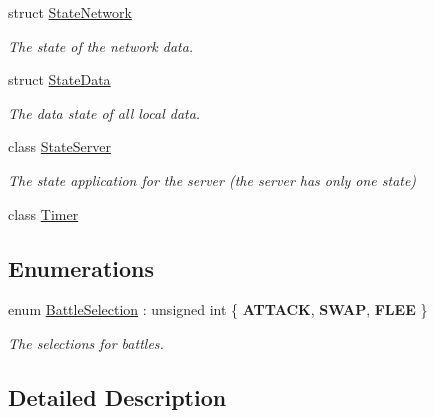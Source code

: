 \begin{DoxyCompactItemize}
struct \hyperlink{struct_state_network}{State\-Network}
\begin{DoxyCompactList}\small\item\em The state of the network data. \end{DoxyCompactList}\item 
struct \hyperlink{struct_state_data}{State\-Data}
\begin{DoxyCompactList}\small\item\em The data state of all local data. \end{DoxyCompactList}\item 
class \hyperlink{class_state_server}{State\-Server}
\begin{DoxyCompactList}\small\item\em The state application for the server (the server has only one state) \end{DoxyCompactList}\item 
class \hyperlink{class_timer}{Timer}
\end{DoxyCompactItemize}
\subsection*{Enumerations}
\begin{DoxyCompactItemize}
\item 
enum \hyperlink{group__server_ga729fc596fd91937095a8172eb71be582}{Battle\-Selection} \-: unsigned int \{ {\bfseries A\-T\-T\-A\-C\-K}, 
{\bfseries S\-W\-A\-P}, 
{\bfseries F\-L\-E\-E}
 \}
\begin{DoxyCompactList}\small\item\em The selections for battles. \end{DoxyCompactList}\end{DoxyCompactItemize}


\subsection{Detailed Description}
